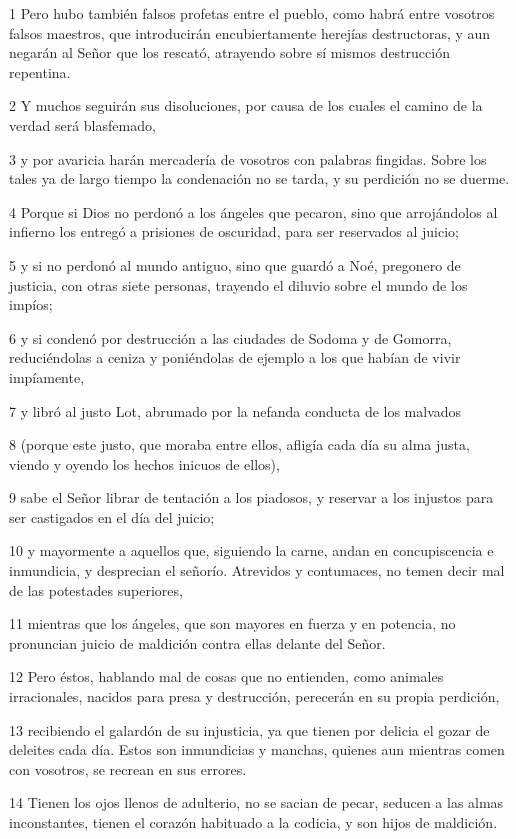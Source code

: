 \par 1 Pero hubo también falsos profetas entre el pueblo, como habrá entre vosotros falsos maestros, que introducirán encubiertamente herejías destructoras, y aun negarán al Señor que los rescató, atrayendo sobre sí mismos destrucción repentina.
\par 2 Y muchos seguirán sus disoluciones, por causa de los cuales el camino de la verdad será blasfemado,
\par 3 y por avaricia harán mercadería de vosotros con palabras fingidas. Sobre los tales ya de largo tiempo la condenación no se tarda, y su perdición no se duerme.
\par 4 Porque si Dios no perdonó a los ángeles que pecaron, sino que arrojándolos al infierno los entregó a prisiones de oscuridad, para ser reservados al juicio;
\par 5 y si no perdonó al mundo antiguo, sino que guardó a Noé, pregonero de justicia, con otras siete personas, trayendo el diluvio sobre el mundo de los impíos;
\par 6 y si condenó por destrucción a las ciudades de Sodoma y de Gomorra, reduciéndolas a ceniza y poniéndolas de ejemplo a los que habían de vivir impíamente,
\par 7 y libró al justo Lot, abrumado por la nefanda conducta de los malvados
\par 8 (porque este justo, que moraba entre ellos, afligía cada día su alma justa, viendo y oyendo los hechos inicuos de ellos),
\par 9 sabe el Señor librar de tentación a los piadosos, y reservar a los injustos para ser castigados en el día del juicio;
\par 10 y mayormente a aquellos que, siguiendo la carne, andan en concupiscencia e inmundicia, y desprecian el señorío. Atrevidos y contumaces, no temen decir mal de las potestades superiores,
\par 11 mientras que los ángeles, que son mayores en fuerza y en potencia, no pronuncian juicio de maldición contra ellas delante del Señor.
\par 12 Pero éstos, hablando mal de cosas que no entienden, como animales irracionales, nacidos para presa y destrucción, perecerán en su propia perdición,
\par 13 recibiendo el galardón de su injusticia, ya que tienen por delicia el gozar de deleites cada día. Estos son inmundicias y manchas, quienes aun mientras comen con vosotros, se recrean en sus errores.
\par 14 Tienen los ojos llenos de adulterio, no se sacian de pecar, seducen a las almas inconstantes, tienen el corazón habituado a la codicia, y son hijos de maldición.
